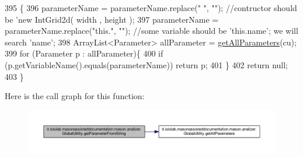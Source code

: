 \begin{DoxyCode}
395                                                                                             \{
396         parameterName = parameterName.replace(\textcolor{stringliteral}{" "}, \textcolor{stringliteral}{""}); \textcolor{comment}{//contructor should be 'new IntGrid2d( width  ,
       height  );}
397         parameterName = parameterName.replace(\textcolor{stringliteral}{"this."}, \textcolor{stringliteral}{""}); \textcolor{comment}{//some variable should be 'this.name'; we will
       search 'name';}
398         ArrayList<Parameter> allParameter = \hyperlink{classit_1_1isislab_1_1masonassisteddocumentation_1_1mason_1_1analizer_1_1_global_utility_abd9cd8d87961f84bb2b7b865e8047a1f}{getAllParameters}(cu);
399         \textcolor{keywordflow}{for} (Parameter p : allParameter)\{
400             \textcolor{keywordflow}{if} (p.getVariableName().equals(parameterName))  \textcolor{keywordflow}{return} p;
401         \}       
402         \textcolor{keywordflow}{return} null;
403     \}
\end{DoxyCode}


Here is the call graph for this function\-:\nopagebreak
\begin{figure}[H]
\begin{center}
\leavevmode
\includegraphics[width=350pt]{classit_1_1isislab_1_1masonassisteddocumentation_1_1mason_1_1analizer_1_1_global_utility_aed7713e549a92beeb05b273f3ad80ff7_cgraph}
\end{center}
\end{figure}


